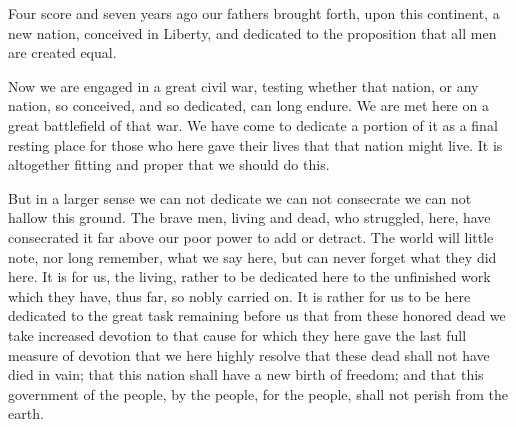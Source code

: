 \documentclass{roffin}
\begin{document}
Four score and seven years ago our fathers brought forth,
upon this continent, a new nation, conceived in Liberty, and dedicated to
the proposition that all men are created equal.

Now we are engaged in a great civil war, testing whether that nation, or any nation, so conceived, and so dedicated, can long endure.
We are met here on a great battlefield of that war. We have come to dedicate a portion of it as a final resting place for those who
here gave their lives that that nation might live. It is altogether fitting and proper that we should do this.


But in a larger sense we can not dedicate we can not consecrate we can not hallow this ground. The brave men, living and dead,
who struggled, here, have consecrated it far above our poor power to add or detract. The world will little note, nor long remember,
what we say here, but can never forget what they did here. It is for us, the living, rather to be dedicated here to the unfinished work
which they have, thus far, so nobly carried on. It is rather for us to be here dedicated to the great task remaining before us that
from these honored dead we take increased devotion to that cause for which they here gave the last full measure of devotion that
we here highly resolve that these dead shall not have died in vain; that this nation shall have a new birth of freedom; and that this
government of the people, by the people, for the people, shall not perish from the earth.
\end{document}

